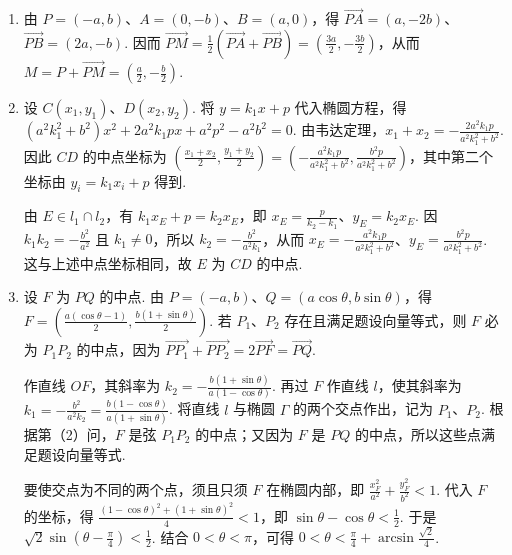 \begin{solution}
\begin{enumerate}
\item 由 \(P=(-a,b)\)、\(A=(0,-b)\)、\(B=(a,0)\)，得 \(\overrightarrow{PA}=(a,-2b)\)、\(\overrightarrow{PB}=(2a,-b)\). 因而 \(\overrightarrow{PM}=\frac{1}{2}\left(\overrightarrow{PA}+\overrightarrow{PB}\right)=\left(\frac{3a}{2},-\frac{3b}{2}\right)\)，从而 \(M=P+\overrightarrow{PM}=\left(\frac{a}{2},-\frac{b}{2}\right)\).

\item 设 \(C(x_1,y_1)\)、\(D(x_2,y_2)\). 将 \(y=k_1x+p\) 代入椭圆方程，得 \(\left(a^2k_1^2+b^2\right)x^2+2a^2k_1px+a^2p^2-a^2b^2=0\). 由韦达定理，\(x_1+x_2=-\frac{2a^2k_1p}{a^2k_1^2+b^2}\). 因此 \(CD\) 的中点坐标为
\(\left(\frac{x_1+x_2}{2},\frac{y_1+y_2}{2}\right)=\left(-\frac{a^2k_1p}{a^2k_1^2+b^2},\frac{b^2p}{a^2k_1^2+b^2}\right)\)，其中第二个坐标由 \(y_i=k_1x_i+p\) 得到.

由 \(E\in l_1\cap l_2\)，有 \(k_1x_E+p=k_2x_E\)，即 \(x_E=\frac{p}{k_2-k_1}\)、\(y_E=k_2x_E\). 因 \(k_1k_2=-\frac{b^2}{a^2}\) 且 \(k_1\neq0\)，所以 \(k_2=-\frac{b^2}{a^2k_1}\)，从而 \(x_E=-\frac{a^2k_1p}{a^2k_1^2+b^2}\)、\(y_E=\frac{b^2p}{a^2k_1^2+b^2}\). 这与上述中点坐标相同，故 \(E\) 为 \(CD\) 的中点.

\item 设 \(F\) 为 \(PQ\) 的中点. 由 \(P=(-a,b)\)、\(Q=(a\cos\theta,b\sin\theta)\)，得 \(F=\left(\frac{a(\cos\theta-1)}{2},\frac{b(1+\sin\theta)}{2}\right)\). 若 \(P_1\)、\(P_2\) 存在且满足题设向量等式，则 \(F\) 必为 \(P_1P_2\) 的中点，因为 \(\overrightarrow{PP_1}+\overrightarrow{PP_2}=2\overrightarrow{PF}=\overrightarrow{PQ}\).

作直线 \(OF\)，其斜率为 \(k_2=-\frac{b(1+\sin\theta)}{a(1-\cos\theta)}\). 再过 \(F\) 作直线 \(l\)，使其斜率为 \(k_1=-\frac{b^2}{a^2k_2}=\frac{b(1-\cos\theta)}{a(1+\sin\theta)}\). 将直线 \(l\) 与椭圆 \(\Gamma\) 的两个交点作出，记为 \(P_1\)、\(P_2\). 根据第（2）问，\(F\) 是弦 \(P_1P_2\) 的中点；又因为 \(F\) 是 \(PQ\) 的中点，所以这些点满足题设向量等式.

要使交点为不同的两个点，须且只须 \(F\) 在椭圆内部，即 \(\frac{x_F^2}{a^2}+\frac{y_F^2}{b^2}<1\). 代入 \(F\) 的坐标，得 \(\frac{(1-\cos\theta)^2+(1+\sin\theta)^2}{4}<1\)，即 \(\sin\theta-\cos\theta<\frac{1}{2}\). 于是 \(\sqrt{2}\sin\left(\theta-\frac{\pi}{4}\right)<\frac{1}{2}\). 结合 \(0<\theta<\pi\)，可得 \(0<\theta<\frac{\pi}{4}+\arcsin\frac{\sqrt{2}}{4}\).
\end{enumerate}
\end{solution}
